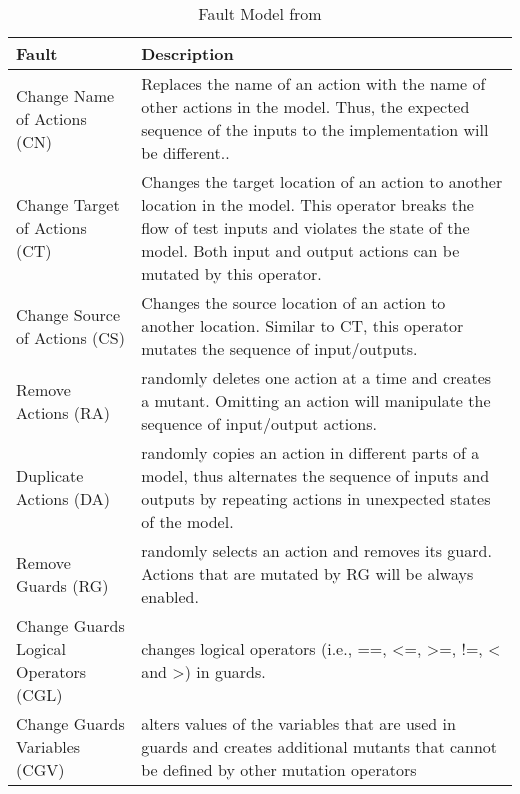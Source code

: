 \begin{table}[h!]
\begin{center}
\footnotesize
\begin{tabular}{|p{5cm}|p{10cm}|}
\hline
\textbf{Fault}&\textbf{Description}\\
\hline
Change Name of Actions (CN) & Replaces the name of an action with the name of other actions in the model. Thus, the expected sequence of the inputs to the implementation will be different..\\
Change Target of Actions (CT) & Changes the target location of an action to another location in the model. This operator breaks the flow of test inputs and violates the state of the model. Both input and output actions can be mutated by this operator.\\
Change Source of Actions (CS)& Changes the source location of an action to another location. Similar to CT, this operator mutates the sequence of input/outputs. \\
Remove Actions (RA)& randomly deletes one action at a time and creates a mutant. Omitting an action will manipulate the sequence of input/output actions.\\
Duplicate Actions (DA)& randomly copies an action in different parts of a model, thus alternates the sequence of inputs and outputs by repeating actions in unexpected states of the model.\\
Remove Guards (RG)& randomly selects an action and removes its guard. Actions that are mutated by RG will be always enabled.\\
Change Guards Logical Operators (CGL)& changes logical operators (i.e., ==, <=, >=, !=, < and >) in guards.\\
Change Guards Variables (CGV) & alters values of the variables that are used in guards and creates additional mutants that cannot be defined by other mutation operators\\
\hline
\end{tabular}
\end{center}
\caption{Fault Model from \cite{Siavashi2018}}
\label{table:faultModel:Siavashi}
\end{table}%
